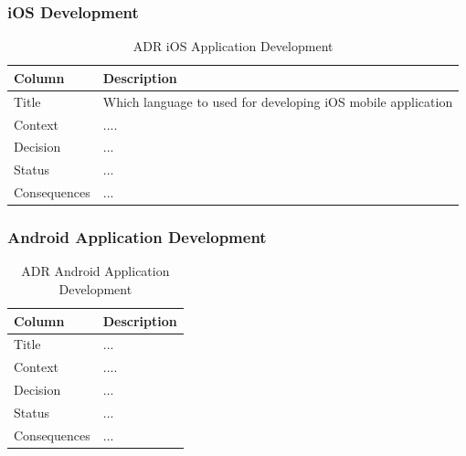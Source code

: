 \documentclass[12pt,a4paper]{article}
\begin{document}
\begin{appendices}
          \subsubsection{iOS Development}
            \begin{table}[H]
              \centering
                \begin{tabularx}{\textwidth}{l X}
                  \hline
                  Column & Description  \\ \hline
                  Title & Which language to used for developing iOS mobile application \\ 
                  Context & ....  \\ 
                  Decision & ...  \\ 
                  Status & ... \\ 
                  Consequences & ... \\                  
                  \hline
                \end{tabularx}
                \caption[Table caption text]{ADR iOS Application Development}
                \label{table:ADR iOS Application Development}
            \end{table}

          \subsubsection{Android Application Development}
            \begin{table}[H]
              \centering
                \begin{tabularx}{\textwidth}{l X}
                  \hline
                  Column & Description  \\ \hline
                  Title & ... \\ 
                  Context & ....  \\ 
                  Decision & ...  \\ 
                  Status & ... \\ 
                  Consequences & ... \\                  
                  \hline
                \end{tabularx}
                \caption[Table caption text]{ADR Android Application Development}
                \label{table:ADR Android Application Development}
            \end{table}


\end{appendices}
\end{document}
